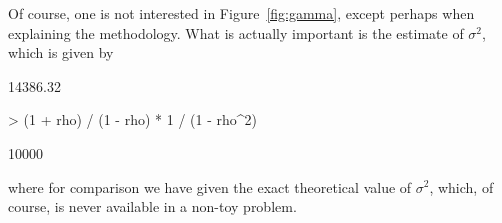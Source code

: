 \documentclass[12pt]{article}
\begin{document}
Of course, one is not interested in Figure~\ref{fig:gamma}, except
perhaps when explaining the methodology.  What is actually important
is the estimate of $\sigma^2$, which is given by
\begin{Schunk}
\begin{Soutput}
[1] 14386.32
\end{Soutput}
\begin{Sinput}
> (1 + rho) / (1 - rho) * 1 / (1 - rho^2)
\end{Sinput}
\begin{Soutput}
[1] 10000
\end{Soutput}
\end{Schunk}
where for comparison we have given the exact theoretical value of $\sigma^2$,
which, of course, is never available in a non-toy problem.
\end{document}
